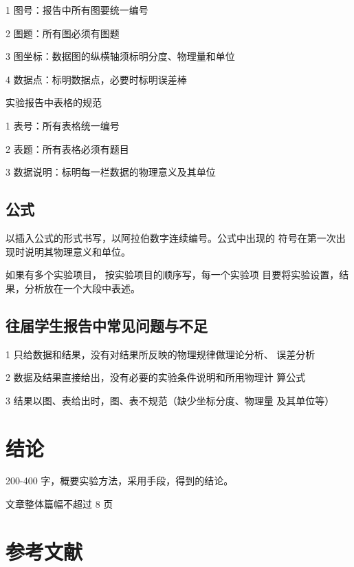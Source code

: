 \documentclass{leptc-exp}
\begin{document}

1 图号：报告中所有图要统一编号

2 图题：所有图必须有图题

3 图坐标：数据图的纵横轴须标明分度、物理量和单位

4 数据点：标明数据点，必要时标明误差棒


实验报告中表格的规范

1 表号：所有表格统一编号

2 表题：所有表格必须有题目

3 数据说明：标明每一栏数据的物理意义及其单位



\subsection{公式}


以插入公式的形式书写，以阿拉伯数字连续编号。公式中出现的
符号在第一次出现时说明其物理意义和单位。

如果有多个实验项目， 按实验项目的顺序写，每一个实验项
目要将实验设置，结果，分析放在一个大段中表述。


\subsection{往届学生报告中常见问题与不足}

1  只给数据和结果，没有对结果所反映的物理规律做理论分析、
误差分析

2  数据及结果直接给出，没有必要的实验条件说明和所用物理计
算公式

3  结果以图、表给出时，图、表不规范（缺少坐标分度、物理量
及其单位等）



\section{结论}

200-400 字，概要实验方法，采用手段，得到的结论。

文章整体篇幅不超过 8 页


\section{参考文献}




\appendix
{}
\end{document}
